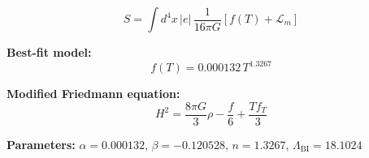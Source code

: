 
\begin{equation}
  S = \int d^4x \, |e| \, \frac{1}{16\pi G} \left[ f(T) + \mathcal{L}_m \right]
\end{equation}

\textbf{Best-fit model:}
\begin{equation}
  f(T) = 0.000132 \, T^{1.3267}
\end{equation}

\textbf{Modified Friedmann equation:}
\begin{equation}
  H^2 = \frac{8\pi G}{3} \rho - \frac{f}{6} + \frac{T f_T}{3}
\end{equation}

\textbf{Parameters:}
$\alpha = 0.000132$, \quad
$\beta = -0.120528$, \quad
$n = 1.3267$, \quad
$\Lambda_{\text{BI}} = 18.1024$